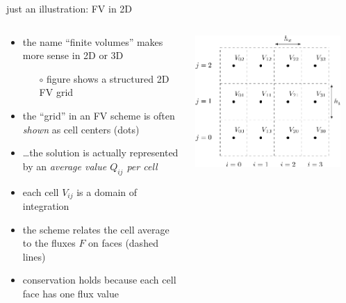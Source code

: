 \documentclass[10pt,dvipsnames,usepdftitle=false,
hyperref={pdftitle = {Finite volume methods},
    pdfauthor = {Ed Bueler}}]{beamer}
\begin{document}
\begin{frame}{just an illustration: FV in 2D}

\begin{columns}
\begin{column}{0.55\textwidth}
\begin{itemize}
\item the name ``finite volumes'' makes more sense in 2D or 3D
    \begin{itemize}
    \item[$\circ$] figure shows a structured 2D FV grid
    \end{itemize}
\item the ``grid'' in an FV scheme is often \emph{shown} as cell centers (dots)
\item \dots the solution is actually represented by an \emph{average value $Q_{ij}$ per cell}
\item each cell $V_{ij}$ is a domain of integration
\item the scheme relates the cell average to the fluxes $F$ on faces (dashed lines)
\item conservation holds because each cell face has one flux value
\end{itemize}
\end{column}
\begin{column}{0.45\textwidth}
\hfill \includegraphics[width=0.9\textwidth]{figs/bueler11p1}
\end{column}
\end{columns}
\end{frame}
\end{document}
